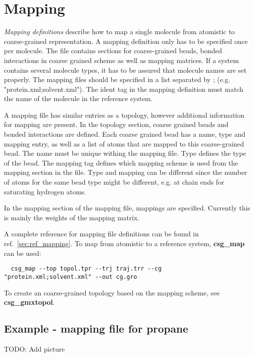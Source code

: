 \section{Mapping}
\label{sec:mapping}
{\em Mapping definitions} describe how to map a single molecule from atomistic to coarse-grained representation. A mapping definition only has to be specified once per molecule. The file contains sections for coarse-grained beads, bonded interactions in coarse grained scheme as well as mapping matrices. If a system contains several molecule types, it has to be assured that molecule names are set properly. The mapping files should be specified in a list separated by ; (e.g. "protein.xml;solvent.xml"). The ident tag in the mapping definition must match the name of the molecule in the reference system.

A mapping file has similar entries as a topology, however additional information for mapping are present. In the topology section, coarse grained beads and bonded interactions are defined. Each coarse grained bead has a name, type and mapping entry, as well as a list of atoms that are mapped to this coarse-grained bead. The name must be unique withing the mapping file. Type defines the type of the bead. The mapping tag defines which mapping scheme is used from the mapping section in the file. Type and mapping can be different since the number of atoms for the same bead type might be different, e.g. at chain ends for saturating hydrogen atoms.

In the mapping section of the mapping file, mappings are specified. Currently this is mainly the weights of the mapping matrix.

A complete reference for mapping file definitions can be found in ref.~\ref{sec:ref_mapping}. To map from atomistic to a reference system, \textbf{csg\_map} can be used:
\begin{verbatim}
  csg_map --top topol.tpr --trj traj.trr --cg "protein.xml;solvent.xml" --out cg.gro
\end{verbatim}

To create an coarse-grained topology based on the mapping scheme, see \textbf{csg\_gmxtopol}.

\subsection{Example - mapping file for propane}
TODO: Add picture


